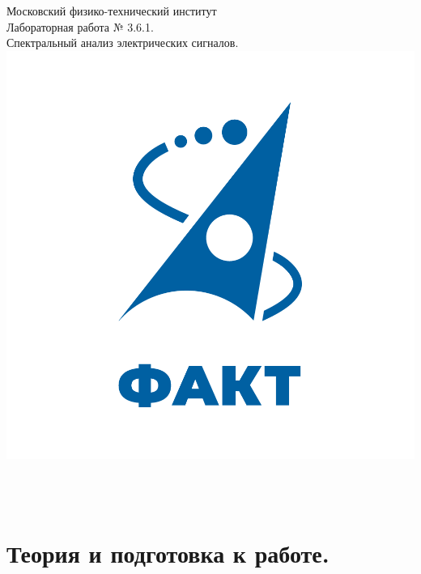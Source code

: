 \documentclass[a4paper,12pt]{article} %
\begin{document}

\begin{titlepage}
\begin{center}
	\large{Московский физико-технический институт}\\
	\vspace{100px}
	\LARGE{Лабораторная работа № 3.6.1.}\\
	\LARGE{Спектральный анализ электрических сигналов.}\\
	\vspace{30px}
	\includegraphics[scale = 0.3]{fakt_logo.png}\\
\end{center}

\vfill
\begin{flushright}
	\\
	\\
\end{flushright}
\end{titlepage}

\newpage

\tableofcontents

\newpage

\section{Теория и подготовка к работе.}
\end{document}
